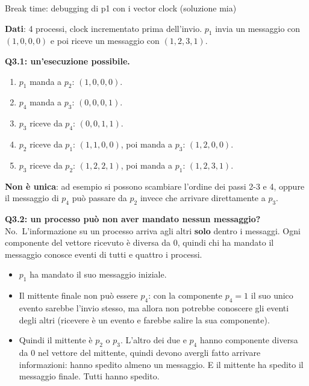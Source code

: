 \begin{approfondimento}{Break time: debugging di p1 con i vector clock (soluzione mia)}

\textbf{Dati}: 4 processi, clock incrementato prima dell'invio. \(p_1\) invia un messaggio con \((1,0,0,0)\) e poi riceve un messaggio con \((1,2,3,1)\).

\textbf{Q3.1: un'esecuzione possibile.}

\begin{enumerate}
\def\labelenumi{\arabic{enumi}.}
\tightlist
\item
  \(p_1\) manda a \(p_2\): \((1,0,0,0)\).
\item
  \(p_4\) manda a \(p_3\): \((0,0,0,1)\).
\item
  \(p_3\) riceve da \(p_4\): \((0,0,1,1)\).
\item
  \(p_2\) riceve da \(p_1\): \((1,1,0,0)\), poi manda a \(p_3\): \((1,2,0,0)\).
\item
  \(p_3\) riceve da \(p_2\): \((1,2,2,1)\), poi manda a \(p_1\): \((1,2,3,1)\).
\end{enumerate}

\textbf{Non è unica}: ad esempio si possono scambiare l'ordine dei passi 2-3 e 4, oppure il messaggio di \(p_4\) può passare da \(p_2\) invece che arrivare direttamente a \(p_3\).

\textbf{Q3.2: un processo può non aver mandato nessun messaggio?} No.~L'informazione su un processo arriva agli altri \textbf{solo} dentro i messaggi. Ogni componente del vettore ricevuto è diversa da 0, quindi chi ha mandato il messaggio conosce eventi di tutti e quattro i processi.

\begin{itemize}
\tightlist
\item
  \(p_1\) ha mandato il suo messaggio iniziale.
\item
  Il mittente finale non può essere \(p_4\): con la componente \(p_4 = 1\) il suo unico evento sarebbe l'invio stesso, ma allora non potrebbe conoscere gli eventi degli altri (ricevere è un evento e farebbe salire la sua componente).
\item
  Quindi il mittente è \(p_2\) o \(p_3\). L'altro dei due e \(p_4\) hanno componente diversa da 0 nel vettore del mittente, quindi devono avergli fatto arrivare informazioni: hanno spedito almeno un messaggio. E il mittente ha spedito il messaggio finale. Tutti hanno spedito.
\end{itemize}

\end{approfondimento}

